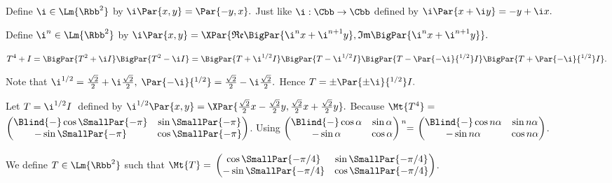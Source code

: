 \par\quad
Define $\i\in\Lm{\Rbb^2}$ by $\i\Par{x,y}=\Par{-y,x}.$ \;Just like $\i:\Cbb\rightarrow\Cbb$ defined by $\i\Par{x+\i y}=-y+\i x.$\vspace{2pt}\par\quad
Define $\i^n\in\Lm{\Rbb^2}$ by $\i\Par{x,y}=\XPar{\mathfrak{Re}\BigPar{\i^n x+\i^{n+1} y},\mathfrak{Im}\BigPar{\i^n x+\i^{n+1} y}}.$\vspace{2pt}\par\quad
$\displaystyle T^4+I=\BigPar{T^2+\i I}\BigPar{T^2-\i I}=\BigPar{T+\i^{1/2}I}\BigPar{T-\i^{1/2}I}\BigPar{T-\Par{-\i}{^{1/2}}I}\BigPar{T+\Par{-\i}{^{1/2}}I}.$\vspace{4pt}\par\quad
Note that $\i^{1/2}=\frac{\sqrt{2}}{2}+\i\frac{\sqrt{2}}{2},\;\Par{-\i}{^{1/2}}=\frac{\sqrt{2}}{2}-\i\frac{\sqrt{2}}{2}.$ \;Hence $T=\pm\Par{\pm\i}{^{1/2}}I.$\vspace{4pt}\par\quad
Let $T=\i^{1/2}I\;$ defined by $\i^{1/2}\Par{x,y}=\XPar{\frac{\sqrt{2}}{2}x-\frac{\sqrt{2}}{2}y,\frac{\sqrt{2}}{2}x+\frac{\sqrt{2}}{2}y}.$\PfEnd\vspace{6pt}\quad
\Or Because $\Mt{T^4}={}$\small$\begin{pmatrix}
	\Blind{-}\cos\SmallPar{-\pi} & \sin\SmallPar{-\pi}\\
	-\sin\SmallPar{-\pi} & \cos\SmallPar{-\pi}
\end{pmatrix}$\large. \;Using {\small$\begin{pmatrix}\Blind{-}\cos\alpha & \sin\alpha\\-\sin\alpha & \cos\alpha\end{pmatrix}$}$\begin{array}{l}\hspace{-5pt}{}_n\\\\\vspace{-6pt}\end{array}\hspace{-8pt}={}${\small$\begin{pmatrix}\Blind{-}\cos n\alpha & \sin n\alpha\\-\sin n\alpha & \cos n\alpha\end{pmatrix}$}.\par\vspace{-6pt}\quad
\Blind{\Or}We define $T\in\Lm{\Rbb^2}$ such that $\Mt{T}={}${\small$\begin{pmatrix}
\cos\SmallPar{-{\pi}/{4}} & \sin\SmallPar{-{\pi}/{4}}\\
-\sin\SmallPar{-{\pi}/{4}} & \cos\SmallPar{-{\pi}/{4}}
\end{pmatrix}$}.\PfEnd\vspace{2pt}
\SepLine

